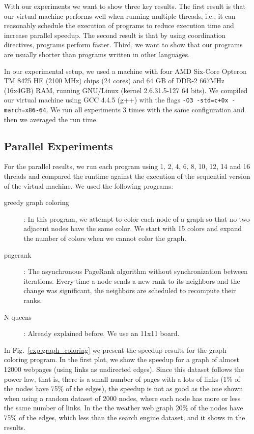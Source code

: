 With our experiments we want to show three key results. The first result is that our virtual machine performs well when running multiple threads,
i.e., it can reasonably schedule the execution of programs to reduce execution time and increase parallel speedup. The second result is that by using coordination directives, programs perform faster. Third, we want to show that our programs are usually shorter than programs written in other languages.  

In our experimental setup, we used a machine with
four AMD Six-Core Opteron TM 8425 HE (2100 MHz) chips (24 cores) and 64 GB of DDR-2 667MHz (16x4GB) RAM,
     running GNU/Linux (kernel 2.6.31.5-127 64 bits).
     We compiled our virtual machine using GCC 4.4.5 (g++) with the flags \texttt{-O3 -std=c+0x -march=x86-64}.
     We run all experiments 3 times with the same configuration and then we averaged the run time.

\subsection{Parallel Experiments}

For the parallel results, we run each program using 1, 2, 4, 6, 8, 10, 12, 14 and 16 threads and compared the runtime against the execution of the sequential version of the virtual machine. We used the following programs:

\begin{description}
   \item[greedy graph coloring]: In this program, we attempt to color each node of a graph so that no two adjacent nodes have the same color. We start with 15 colors and expand the number of colors when we cannot color the graph.
   \item[pagerank]: The asynchronous PageRank algorithm without synchronization between iterations. Every time a node sends a new rank to its neighbors and the change was significant, the neighbors are scheduled to recompute their ranks.
   \item[N queens]: Already explained before. We use an 11x11 board.
\end{description}

In Fig.~\ref{exp:graph_coloring} we present the speedup results for the graph coloring program. In the first plot, we show the speedup for a graph of almost 12000 webpages (using links as undirected edges). Since this dataset follows the power law, that is, there is a small number of pages with a lots of links (1\% of the nodes have 75\% of the edges), the speedup is not as good as the one shown when using a random dataset of 2000 nodes, where each node has more or less the same number of links. In the the weather web graph 20\% of the nodes have 75\% of the edges, which less than the search engine dataset, and it shows in the results.

